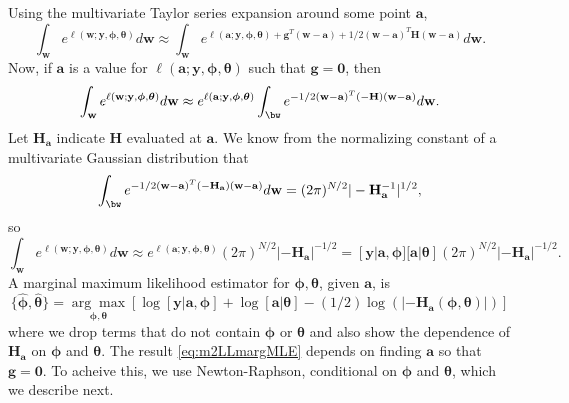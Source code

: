 \documentclass[12pt, titlepage]{article}
\begin{document}
Using the multivariate Taylor series expansion around some point $\mathbf{a}$,
$$
\int_\mathbf{w} e^{\ell(\mathbf{w};\mathbf{y},\boldsymbol{\phi},\boldsymbol{\theta})} d\mathbf{w} \approx \int_\mathbf{w} e^{\ell(\mathbf{a};\mathbf{y},\boldsymbol{\phi},\boldsymbol{\theta}) + \mathbf{g}^{T}(\mathbf{w} -\mathbf{a}) + 1/2(\mathbf{w} - \mathbf{a})^{T}\mathbf{H}(\mathbf{w} - \mathbf{a})} d\mathbf{w}.
$$
Now, if $\mathbf{a}$ is a value for $\ell(\mathbf{a};\mathbf{y},\boldsymbol{\phi},\boldsymbol{\theta})$ such that $\mathbf{g} = \mathbf{0}$, then
$$
\int_\mathbf{w} e^{\ell(\mathbf{w};\mathbf{y},\boldsymbol{\phi},\boldsymbol{\theta})} d\mathbf{w} \approx e^{\ell(\mathbf{a};\mathbf{y},\boldsymbol{\phi},\boldsymbol{\theta})} \int_\bw e^{ -  
	1/2(\mathbf{w} - \mathbf{a})^{T}(-\mathbf{H})(\mathbf{w} - \mathbf{a})} d\mathbf{w}.
$$
Let $\mathbf{H}_\mathbf{a}$ indicate $\mathbf{H}$ evaluated at $\mathbf{a}$. We know from the normalizing constant of a multivariate Gaussian distribution that 
$$
\int_\bw e^{-1/2(\mathbf{w} - \mathbf{a})^{T}(-\mathbf{H}_{\mathbf{a}})(\mathbf{w} - \mathbf{a})} d\mathbf{w} = (2\pi)^{N/2}|-\mathbf{H}^{-1}_\mathbf{a}|^{1/2},
$$
so
\[
\int_\mathbf{w} e^{\ell(\mathbf{w};\mathbf{y},\boldsymbol{\phi},\boldsymbol{\theta})} d\mathbf{w} \approx e^{\ell(\mathbf{a};\mathbf{y},\boldsymbol{\phi},\boldsymbol{\theta})} (2\pi)^{N/2}|-\mathbf{H}_\mathbf{a}|^{-1/2} = [\mathbf{y}|\mathbf{a},\boldsymbol{\phi}][\mathbf{a}|\boldsymbol{\theta}](2\pi)^{N/2}|-\mathbf{H}_\mathbf{a}|^{-1/2}.
\]
A marginal maximum likelihood estimator for $\boldsymbol{\phi}, \boldsymbol{\theta}$, given $\mathbf{a}$, is
\begin{equation} \label{eq:m2LLmargMLE}
\{\hat{\boldsymbol{\phi}}, \hat{\boldsymbol{\theta}} \} = \underset{\boldsymbol{\phi},\boldsymbol{\theta}}{\arg\max} \left[ \log[\mathbf{y}|\mathbf{a},\mathbf{\phi}] +
	\log[\mathbf{a}|\mathbf{\theta}] - (1/2)\log(|-\mathbf{H}_\mathbf{a}(\boldsymbol{\phi},\boldsymbol{\theta})|) \right]
\end{equation}
where we drop terms that do not contain $\boldsymbol{\phi}$ or $\boldsymbol{\theta}$ and also show the dependence of $\mathbf{H}_\mathbf{a}$ on $\boldsymbol{\phi}$ and $\boldsymbol{\theta}$.  The result \eqref{eq:m2LLmargMLE} depends on finding $\mathbf{a}$ so that $\mathbf{g} = \mathbf{0}$.  To acheive this, we use Newton-Raphson, conditional on $\boldsymbol{\phi}$ and $\boldsymbol{\theta}$, which we describe next.
\end{document}
